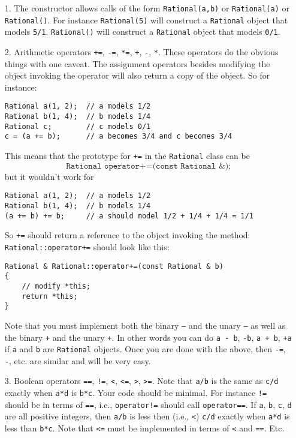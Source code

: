 \begin{itemize}
  
\item[1.]
The constructor allows calls of the form
\verb!Rational(a,b)! or \verb!Rational(a)! or \verb!Rational()!.
For instance \verb!Rational(5)! will construct a \verb!Rational! object
that models \verb!5/1!. \verb!Rational()! will construct a
\verb!Rational! object that models \verb!0/1!.

\item[2.]
Arithmetic operators
\texttt{+=},
\texttt{-=},
\texttt{*=},
\texttt{+},
\texttt{-},
\texttt{*}.
These operators do the obvious things with one caveat.
The assignment operators besides modifying the object invoking the operator
will also return a copy of the object. So for instance:
{\small
\begin{Verbatim}[frame=single]
Rational a(1, 2);  // a models 1/2
Rational b(1, 4);  // b models 1/4
Rational c;        // c models 0/1
c = (a += b);      // a becomes 3/4 and c becomes 3/4
\end{Verbatim}
}
This means that the prototype for \texttt{+=} in the
\texttt{Rational} class can be
\[
\texttt{Rational operator+=(const Rational \&);}
\]
but it wouldn't work for
{\small
\begin{Verbatim}[frame=single]
Rational a(1, 2);  // a models 1/2
Rational b(1, 4);  // b models 1/4
(a += b) += b;     // a should model 1/2 + 1/4 + 1/4 = 1/1
\end{Verbatim}
}
So \verb!+=! should return a reference to the object
invoking the method:
\\
\texttt{Rational::operator+=} should look like this:
\begin{Verbatim}[frame=single]
Rational & Rational::operator+=(const Rational & b)
{
    // modify *this;
    return *this;
}
\end{Verbatim}
Note that you must implement both the binary \texttt{–} and the unary
\texttt{–}  as well as the binary \texttt{+} and the unary \texttt{+}.
In other words you can do
\texttt{a - b}, \texttt{-b}, \texttt{a + b},
\texttt{+a} if \texttt{a} and \texttt{b} are \texttt{Rational} objects.
Once you are done with the above, then
\verb!-=!,
\verb!-!, etc. are similar and will be very easy.


\item[3.]
Boolean operators
\texttt{==},
\texttt{!=},
\texttt{<},
\texttt{<=},
\texttt{>},
\texttt{>=}.
Note that \texttt{a/b} is the same as \texttt{c/d} exactly
when \texttt{a*d} is \texttt{b*c}.
Your code should be minimal. For instance \texttt{!=} should be in terms of
\texttt{==}, i.e., \texttt{operator!=} should call \texttt{operator==}.
If \texttt{a}, \texttt{b}, \texttt{c}, \texttt{d} are all positive integers,
then \texttt{a/b} is less then (i.e., \texttt{<}) \texttt{c/d}
exactly when \texttt{a*d} is less than \texttt{b*c}. Note that \texttt{<=}
must be implemented in terms of \texttt{<} and \texttt{==}. Etc.


\end{itemize}
